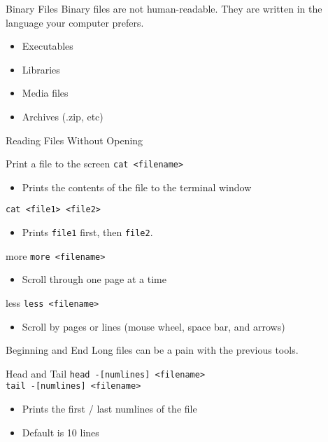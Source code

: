 \documentclass[11pt]{beamer}
\newcommand{\colbf}[1]{\textcolor{mLightBrown!77!black}{#1}}%
\begin{document}
\begin{frame}[fragile]{Binary Files}
  Binary files are not human-readable.  They are written in the language your computer prefers.
  \begin{itemize}[<+- | alert@+>]
    \item Executables
    \item Libraries
    \item Media files
    \item Archives (.zip, etc)
  \end{itemize}
\end{frame}

\begin{frame}[fragile]{Reading Files Without Opening}
  \begin{block}{Print a file to the screen}
    \texttt{cat <filename>}
    \begin{itemize}
      \item Prints the contents of the file to the terminal window
    \end{itemize}
    \texttt{cat <file1> <file2>}
    \begin{itemize}
      \item Prints \texttt{file1} first, then \texttt{file2}.
    \end{itemize}
  \end{block}
  \begin{block}{\colbf{more}}
    \texttt{more <filename>}
    \begin{itemize}
      \item Scroll through one page at a time
    \end{itemize}
  \end{block}
  \begin{block}{\colbf{less}}
    \texttt{less <filename>}
    \begin{itemize}
      \item Scroll by pages or lines (mouse wheel, space bar, and arrows)
    \end{itemize}
  \end{block}
\end{frame}

\begin{frame}[fragile]{Beginning and End}
  Long files can be a pain with the previous tools.

  \begin{block}{\colbf{Head} and \colbf{Tail}}
    \texttt{head -[numlines] <filename>}\\
    \texttt{tail -[numlines] <filename>}
    \begin{itemize}
      \item Prints the first / last numlines of the file
      \item Default is 10 lines 
    \end{itemize}
  \end{block}
\end{frame}
\end{document}
